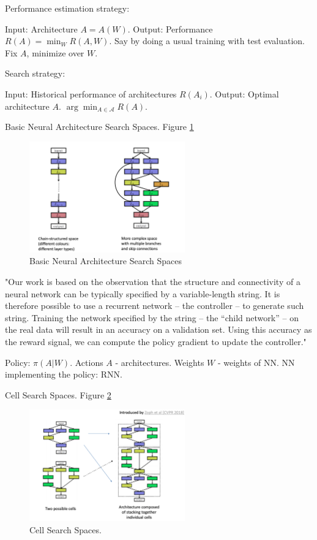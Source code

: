 \documentclass[english]{article}
\begin{document}
Performance estimation strategy: 

Input: Architecture $A=A(W)$. Output: Performance $R(A)=\min_W R(A,W)$. Say by doing a usual training with test evaluation. Fix $A$, minimize over $W$.


Search strategy: 

Input: Historical performance of architectures $R(A_i)$. Output: Optimal architecture $A$.  $\arg\min_{A\in\mathcal{A}} R(A)$.





\item Basic Neural Architecture Search Spaces. Figure \ref{nas2}  
\begin{figure}[h!]
  \centering
  \includegraphics[width=0.6\textwidth]{nas2.png}
  \caption{Basic Neural Architecture Search Spaces}
  \label{nas2}
\end{figure}

"Our work is based on the observation that the structure and connectivity of a neural network can be typically specified by a variable-length string. It is therefore possible to use
a recurrent network – the controller – to generate such string. Training the network specified by the
string – the “child network” – on the real data will result in an accuracy on a validation set. Using
this accuracy as the reward signal, we can compute the policy gradient to update the controller."


Policy: $\pi(A|W)$. Actions $A$ - architectures. Weights $W$ - weights of NN. NN implementing the policy: RNN.


\item Cell Search Spaces. Figure \ref{nas3}  


\begin{figure}[h!]
  \centering
  \includegraphics[width=0.6\textwidth]{nas3.png}
  \caption{Cell Search Spaces.}
  \label{nas3}
\end{figure}
\end{document}
